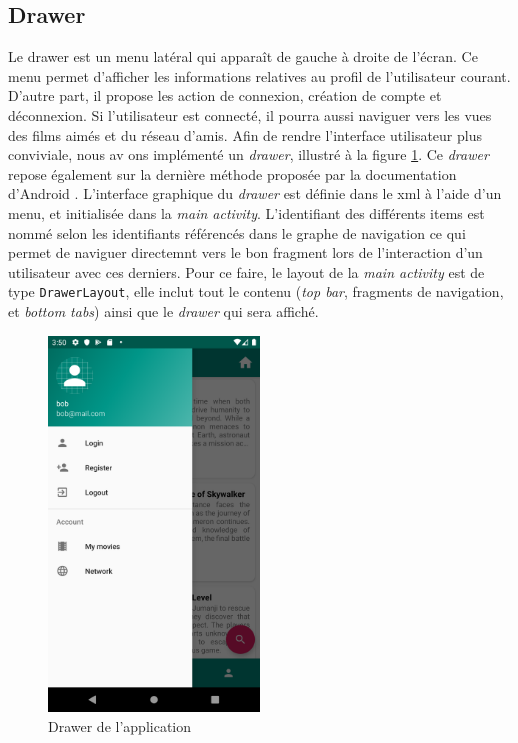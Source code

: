 \subsection{Drawer}
Le drawer est un menu latéral qui apparaît de gauche à droite de l'écran. Ce menu permet d'afficher les informations relatives au profil de l'utilisateur courant. D'autre part, il propose les action de connexion, création de compte et déconnexion. Si l'utilisateur est connecté, il pourra aussi naviguer vers les vues des films aimés et du réseau d'amis.
Afin de rendre l'interface utilisateur plus conviviale, nous av
ons implémenté un \textit{drawer}, illustré à la figure \ref{drawer}. Ce \textit{drawer} repose également sur la dernière méthode proposée par la documentation d'Android \cite{docandroid}. L'interface graphique du \textit{drawer} est définie dans le \acrshort{xml} à l'aide d'un menu, et initialisée dans la \textit{main activity}. L'identifiant des différents items est nommé selon les identifiants référencés dans le graphe de navigation ce qui permet de naviguer directemnt vers le bon fragment lors de l'interaction d'un utilisateur avec ces derniers. Pour ce faire, le layout de la \textit{main activity} est de type \texttt{DrawerLayout}, elle inclut tout le contenu (\textit{top bar}, fragments de navigation, et \textit{bottom tabs}) ainsi que le \textit{drawer} qui sera affiché.
\begin{figure}
    \begin{center}
        \includegraphics[width=0.5\textwidth]{img/screenshots/Drawer.png}
    \end{center}
    \caption{Drawer de l'application}
    \label{drawer}
\end{figure}


